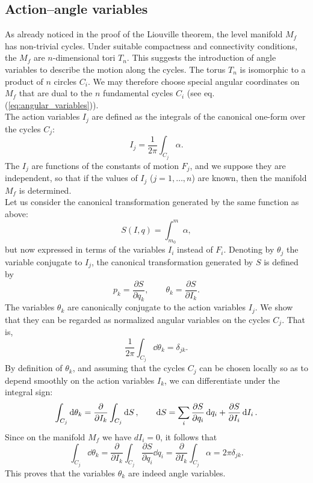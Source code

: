 \subsection{Action--angle variables} \label{subsec:Action--angle variables}
As already noticed in the proof of the Liouville theorem, the level manifold $M_f$ has non-trivial cycles. Under suitable compactness and connectivity conditions, the $M_f$ are $n$-dimensional tori $T_n$. This suggests the introduction of angle variables to describe the motion along the cycles. The torus $T_n$ is isomorphic to a product of $n$ circles $C_i$. We may therefore choose special angular coordinates on $M_f$ that are dual to the $n$ fundamental cycles $C_i$ (see eq. (\ref{eq:angular_variables})).\\
The action variables $I_j$ are defined as the integrals of the canonical one-form over the cycles $C_j$:
\begin{equation}
    I_j = \frac{1}{2\pi} \int_{C_j} \alpha.
\end{equation}
The $I_j$ are functions of the constants of motion $F_j$, and we suppose they are independent, so that if the values of $I_j$ ($j = 1, \ldots, n$) are known, then the manifold $M_f$ is determined.\\
Let us consider the canonical transformation generated by the same function as above:
\begin{equation}
    S(I, q) = \int_{m_0}^{m} \alpha,
\end{equation}
but now expressed in terms of the variables $I_i$ instead of $F_i$.  
Denoting by $\theta_j$ the variable conjugate to $I_j$, the canonical transformation generated by $S$ is defined by
\begin{equation}
    p_k = \frac{\partial S}{\partial q_k}, 
    \qquad 
    \theta_k = \frac{\partial S}{\partial I_k}.
\end{equation}
The variables $\theta_k$ are canonically conjugate to the action variables $I_j$.  
We show that they can be regarded as normalized angular variables on the cycles $C_j$.  
That is,
\begin{equation}\label{eq:angular_variables}
    \frac{1}{2\pi} \int_{C_j} \dd{\theta_k} = \delta_{jk}.
\end{equation}
By definition of $\theta_k$, and assuming that the cycles $C_j$ can be chosen locally so as to depend smoothly on the action variables $I_k$, we can differentiate under the integral sign:
\begin{equation}
    \int_{C_j} \dd{\theta_k} 
    = \pdv{}{I_k} \int_{C_j} \dd{S}, 
    \qquad 
    \dd{S} = \sum_i \pdv{S}{q_i} \dd{q_i} + \pdv{S}{I_i} \dd{I_i}.
\end{equation}
Since on the manifold $M_f$ we have $dI_i = 0$, it follows that
\begin{equation}
    \int_{C_j} \dd{\theta_k}
    = \frac{\partial}{\partial I_k} 
    \int_{C_j} 
    \frac{\partial S}{\partial q_i} \dd{q_i} 
    = \frac{\partial}{\partial I_k} 
    \int_{C_j} \alpha 
    = 2\pi \delta_{jk}.
\end{equation}
This proves that the variables $\theta_k$ are indeed angle variables.
